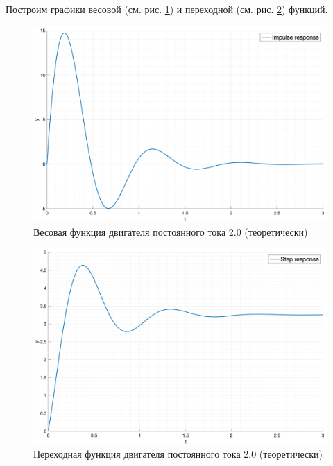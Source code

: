 Построим графики весовой (см. рис. \ref{fig:task2_impulse_response_eq}) и переходной (см. рис. \ref{fig:task2_step_response_eq}) функций.
\begin{figure}[ht!]
    \centering
    \includegraphics[width=\textwidth]{media/plots/task2_impulse_response_eq.png}
    \caption{Весовая функция двигателя постоянного тока 2.0 (теоретически)}
    \label{fig:task2_impulse_response_eq}
\end{figure}
\begin{figure}[ht!]
    \centering
    \includegraphics[width=\textwidth]{media/plots/task2_step_response_eq.png}
    \caption{Переходная функция двигателя постоянного тока 2.0 (теоретически)}
    \label{fig:task2_step_response_eq}
\end{figure}

